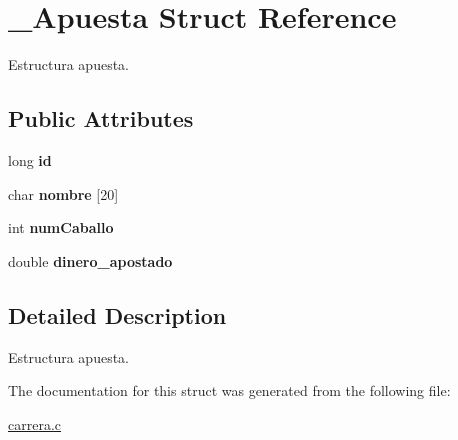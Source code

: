 \hypertarget{struct__Apuesta}{}\section{\+\_\+\+Apuesta Struct Reference}
\label{struct__Apuesta}


Estructura apuesta.  


\subsection*{Public Attributes}
\begin{DoxyCompactItemize}
\item 
long {\bfseries id}\hypertarget{struct__Apuesta_aaa377830ba615faf9c7cb0bdbb8554e5}{}\label{struct__Apuesta_aaa377830ba615faf9c7cb0bdbb8554e5}

\item 
char {\bfseries nombre} \mbox{[}20\mbox{]}\hypertarget{struct__Apuesta_ae4d7fe3277098d3c32d34b435408873e}{}\label{struct__Apuesta_ae4d7fe3277098d3c32d34b435408873e}

\item 
int {\bfseries num\+Caballo}\hypertarget{struct__Apuesta_a217a68a637b2db3e61068bafc18ef1ac}{}\label{struct__Apuesta_a217a68a637b2db3e61068bafc18ef1ac}

\item 
double {\bfseries dinero\+\_\+apostado}\hypertarget{struct__Apuesta_a2b7cfea0be5bc195bd56e5f8a97841f4}{}\label{struct__Apuesta_a2b7cfea0be5bc195bd56e5f8a97841f4}

\end{DoxyCompactItemize}


\subsection{Detailed Description}
Estructura apuesta. 

The documentation for this struct was generated from the following file\+:\begin{DoxyCompactItemize}
\item 
\hyperlink{carrera_8c}{carrera.\+c}\end{DoxyCompactItemize}
